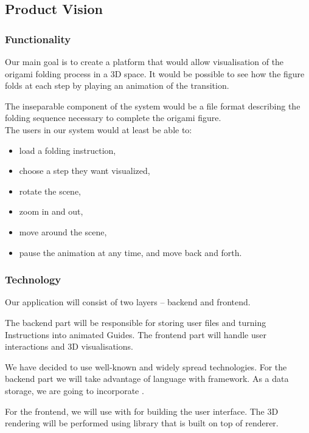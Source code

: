 \subsection{Product Vision}

\subsubsection{Functionality}

Our main goal is to create a platform that would allow visualisation of the origami folding process in a 3D space.
It would be possible to see how the figure folds at each step by playing an animation of the transition.

The inseparable component of the system would be a file format describing the folding sequence necessary to complete the origami figure.\\

The users in our system would at least be able to:
\begin{itemize}
	\item load a folding instruction,
	\item choose a step they want visualized,
	\item rotate the scene,
    \item zoom in and out,
	\item move around the scene,
	\item pause the animation at any time, and move back and forth.
\end{itemize}

\subsubsection{Technology}

Our application will consist of two layers -- backend and frontend.

The backend part will be responsible for storing user files and turning Instructions into animated Guides.
The frontend part will handle user interactions and 3D visualisations.

We have decided to use well-known and widely spread technologies.
For the backend part we will take advantage of  language with  framework.
As a data storage, we are going to incorporate .

For the frontend, we will use  with  for building the user interface.
The 3D rendering will be performed using  library that is built on top of  renderer.

